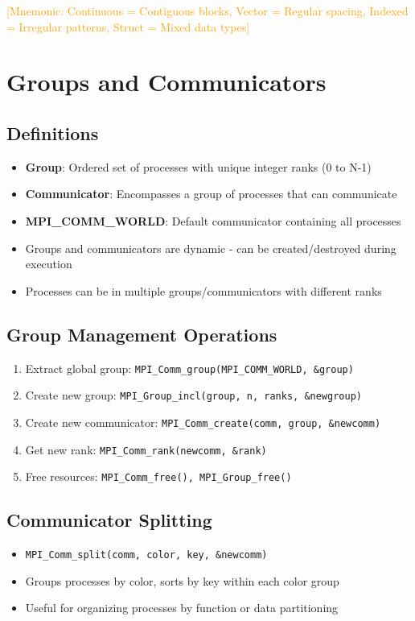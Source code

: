 \documentclass[12pt]{article}
\begin{document}
\textcolor{orange}{[Mnemonic: Continuous = Contiguous blocks, Vector = Regular spacing, Indexed = Irregular patterns, Struct = Mixed data types]}

\section{Groups and Communicators}

\subsection{Definitions}
\begin{itemize}
    \item \textbf{Group}: Ordered set of processes with unique integer ranks (0 to N-1)
    \item \textbf{Communicator}: Encompasses a group of processes that can communicate
    \item \textbf{MPI\_COMM\_WORLD}: Default communicator containing all processes
    \item Groups and communicators are dynamic - can be created/destroyed during execution
    \item Processes can be in multiple groups/communicators with different ranks
\end{itemize}

\subsection{Group Management Operations}
\begin{enumerate}
    \item Extract global group: \texttt{MPI\_Comm\_group(MPI\_COMM\_WORLD, \&group)}
    \item Create new group: \texttt{MPI\_Group\_incl(group, n, ranks, \&newgroup)}
    \item Create new communicator: \texttt{MPI\_Comm\_create(comm, group, \&newcomm)}
    \item Get new rank: \texttt{MPI\_Comm\_rank(newcomm, \&rank)}
    \item Free resources: \texttt{MPI\_Comm\_free(), MPI\_Group\_free()}
\end{enumerate}

\subsection{Communicator Splitting}
\begin{itemize}
    \item \texttt{MPI\_Comm\_split(comm, color, key, \&newcomm)}
    \item Groups processes by color, sorts by key within each color group
    \item Useful for organizing processes by function or data partitioning
\end{itemize}
\end{document}
